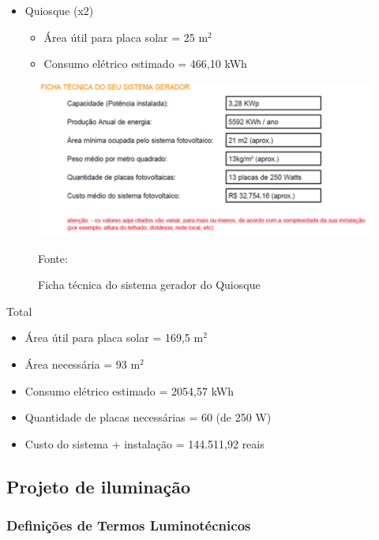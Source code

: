 \begin{itemize}
         \item Quiosque (x2)
	           \begin{itemize}
                       \item \'Area \'util para placa solar	=	25 m$^{2}$ 
                       \item Consumo el\'etrico estimado	=	466,10 kWh      
                  \end{itemize}	 
\end{itemize}

\begin{figure}[H]
	 \centering
	\label{SistemaGeradorQuiosque}
	 \includegraphics[keepaspectratio=true,scale=0.8]{figuras/SistemaGeradorQuiosque.png}
	 \caption{Ficha t\'ecnica do sistema gerador do Quiosque}
	\small{Fonte: \cite{PortalSolar}}
\end{figure}

Total

 \begin{itemize}
        \item \'Area \'util para placa solar	=	169,5 m$^{2}$ 
        \item \'Area necess\'aria	=	93 m$^{2}$ 
        \item Consumo el\'etrico estimado	=	2054,57 kWh
	\item Quantidade de placas necess\'arias	=	60 (de 250 W)
	\item Custo do sistema + instala\c{c}\~ao	=	144.511,92 reais
\end{itemize}

\subsection{Projeto de ilumina\c{c}\~ao}

\subsubsection{Defini\c{c}\~oes de Termos Luminot\'ecnicos}

